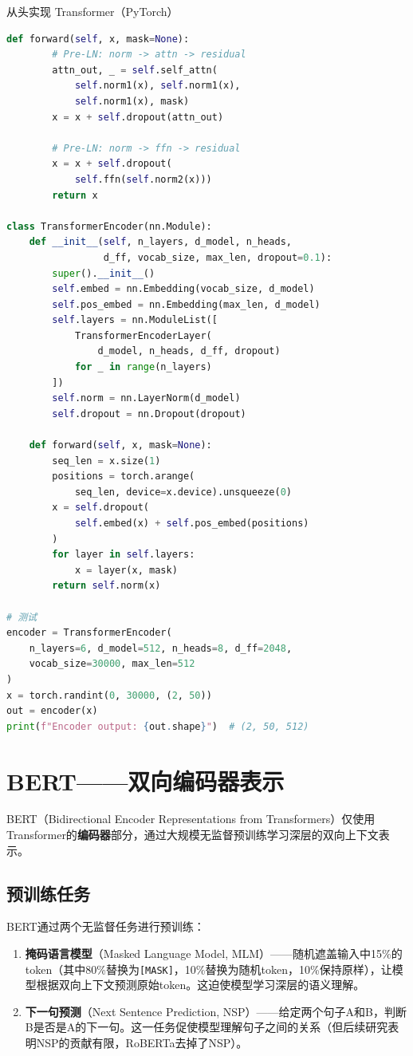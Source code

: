 \begin{mycode}{从头实现 Transformer（PyTorch）}
\begin{lstlisting}[language=Python]
    def forward(self, x, mask=None):
        # Pre-LN: norm -> attn -> residual
        attn_out, _ = self.self_attn(
            self.norm1(x), self.norm1(x),
            self.norm1(x), mask)
        x = x + self.dropout(attn_out)

        # Pre-LN: norm -> ffn -> residual
        x = x + self.dropout(
            self.ffn(self.norm2(x)))
        return x

class TransformerEncoder(nn.Module):
    def __init__(self, n_layers, d_model, n_heads,
                 d_ff, vocab_size, max_len, dropout=0.1):
        super().__init__()
        self.embed = nn.Embedding(vocab_size, d_model)
        self.pos_embed = nn.Embedding(max_len, d_model)
        self.layers = nn.ModuleList([
            TransformerEncoderLayer(
                d_model, n_heads, d_ff, dropout)
            for _ in range(n_layers)
        ])
        self.norm = nn.LayerNorm(d_model)
        self.dropout = nn.Dropout(dropout)

    def forward(self, x, mask=None):
        seq_len = x.size(1)
        positions = torch.arange(
            seq_len, device=x.device).unsqueeze(0)
        x = self.dropout(
            self.embed(x) + self.pos_embed(positions)
        )
        for layer in self.layers:
            x = layer(x, mask)
        return self.norm(x)

# 测试
encoder = TransformerEncoder(
    n_layers=6, d_model=512, n_heads=8, d_ff=2048,
    vocab_size=30000, max_len=512
)
x = torch.randint(0, 30000, (2, 50))
out = encoder(x)
print(f"Encoder output: {out.shape}")  # (2, 50, 512)
\end{lstlisting}
\end{mycode}

\section{BERT——双向编码器表示}

BERT（Bidirectional Encoder Representations from Transformers）仅使用Transformer的\textbf{编码器}部分，通过大规模无监督预训练学习深层的双向上下文表示。

\subsection{预训练任务}

BERT通过两个无监督任务进行预训练：
\begin{enumerate}
    \item \textbf{掩码语言模型}（Masked Language Model, MLM）——随机遮盖输入中15\%的token（其中80\%替换为\texttt{[MASK]}，10\%替换为随机token，10\%保持原样），让模型根据双向上下文预测原始token。这迫使模型学习深层的语义理解。

    \item \textbf{下一句预测}（Next Sentence Prediction, NSP）——给定两个句子A和B，判断B是否是A的下一句。这一任务促使模型理解句子之间的关系（但后续研究表明NSP的贡献有限，RoBERTa去掉了NSP）。
\end{enumerate}


